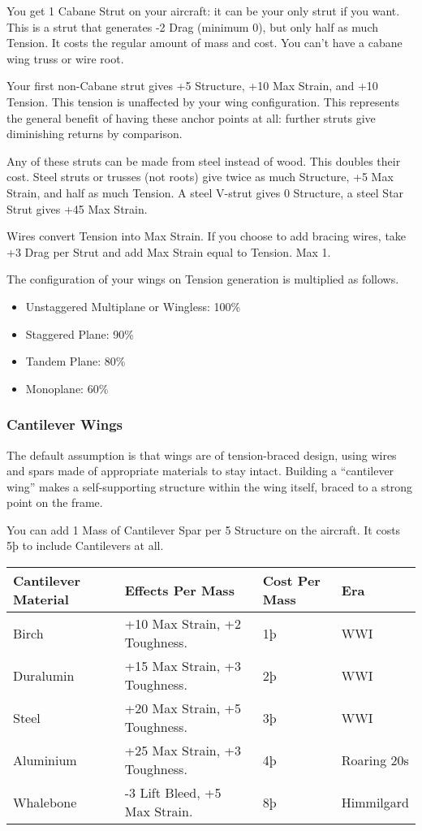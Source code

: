 \documentclass{article}
\begin{document}
You get 1 Cabane Strut on your aircraft: it can be your only
strut if you want. This is a strut that generates -2 Drag (minimum 0),
but only half as much Tension. It costs the regular amount of mass and
cost. You can't have a cabane wing truss or wire root.

Your first non-Cabane strut gives +5 Structure, +10 Max Strain,
and +10 Tension. This tension is unaffected by your wing configuration.
This represents the general benefit of having these anchor points at
all: further struts give diminishing returns by comparison.

Any of these struts can be made from steel instead of wood. This
doubles their cost. Steel struts or trusses (not roots) give twice as
much Structure, +5 Max Strain, and half as much Tension. A steel V-strut
gives 0 Structure, a steel Star Strut gives +45 Max Strain.

Wires convert Tension into Max Strain. If you choose to add
bracing wires, take +3 Drag per Strut and add Max Strain equal to
Tension. Max 1.

The configuration of your wings on Tension generation is
multiplied as follows.

\begin{itemize}
  \item          Unstaggered Multiplane or Wingless: 100\%
  \item          Staggered Plane: 90\%
  \item          Tandem Plane: 80\%
  \item          Monoplane: 60\%
\end{itemize}

\subsubsection{Cantilever Wings}
\label{_Cantilever_Wings}

The default assumption is that wings are of tension-braced design, using
wires and spars made of appropriate materials to stay intact. Building a
``cantilever wing'' makes a self-supporting structure within the wing
itself, braced to a strong point on the frame.

You can add 1 Mass of Cantilever Spar per 5 Structure on the aircraft.
It costs 5þ to include Cantilevers at all.

\begin{tabular}{|l|l|l|l|}
  \hline
  Cantilever Material & Effects Per Mass              & Cost Per Mass & Era         \\\hline
  Birch               & +10 Max Strain, +2 Toughness. & 1þ            & WWI         \\\hline
  Duralumin           & +15 Max Strain, +3 Toughness. & 2þ            & WWI         \\\hline
  Steel               & +20 Max Strain, +5 Toughness. & 3þ            & WWI         \\\hline
  Aluminium           & +25 Max Strain, +3 Toughness. & 4þ            & Roaring 20s \\\hline
  Whalebone           & -3 Lift Bleed, +5 Max Strain. & 8þ            & Himmilgard  \\\hline
\end{tabular}
\end{document}
